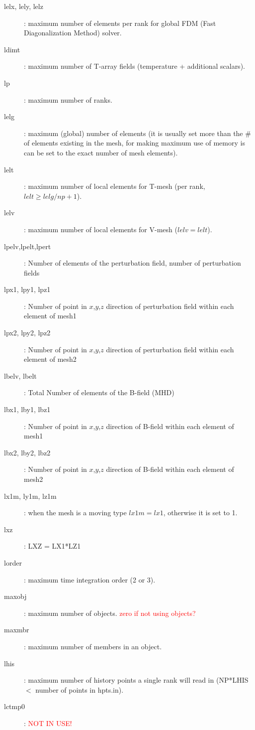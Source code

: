 \begin{description}
\item [lelx, lely, lelz]: maximum number of elements per rank for global FDM (Fast Diagonalization Method) solver.
\item [ldimt]:  maximum number of T-array fields (temperature + additional scalars).
\item [lp]: maximum number of ranks.
\item [lelg]: maximum (global) number of elements (it is usually set more than the \# of elements existing in the mesh, for making maximum use of memory is can be set to the exact number of mesh elements).\\
\item [lelt]: maximum number of local elements for T-mesh (per rank, \(lelt \geq lelg/np +1 \)).
\item [lelv]: maximum number of local elements for V-mesh (\(lelv = lelt\)).
\item [lpelv,lpelt,lpert ]: Number of elements of the perturbation field, number of perturbation fields
\item [lpx1, lpy1, lpz1]: Number of point in \(x\),\(y\),\(z\) direction of perturbation field within each element of mesh1
\item [lpx2, lpy2, lpz2]: Number of point in \(x\),\(y\),\(z\) direction of perturbation field within each element of mesh2
\item [lbelv, lbelt]: Total Number of elements of the B-field (MHD)
\item [lbx1, lby1, lbz1]: Number of point in \(x\),\(y\),\(z\) direction of B-field within each element of mesh1
\item [lbx2, lby2, lbz2]: Number of point in \(x\),\(y\),\(z\) direction of B-field within each element of mesh2
\item [lx1m, ly1m, lz1m]: when the mesh is a moving type \(lx1m=lx1\), otherwise it is set to 1.
\item [lxz] : LXZ = LX1*LZ1\\
\item [lorder]: maximum time integration order (2 or 3).
\item [maxobj]: maximum number of objects. {\textcolor{red}{zero if not using objects?}}
\item [maxmbr]: maximum number of members in an object.
\item [lhis]: maximum number of history points a single rank will read in (NP*LHIS \(<\) number of points in hpts.in).
\item [lctmp0] : {\textcolor{red}{NOT IN USE!}} \\

\end{description}
